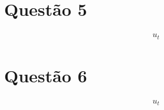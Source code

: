 \documentclass[12pt,a4paper]{article}
\begin{document}
		\begin{flushright}
		\end{flushright}

	\section{Quest\~ao 5}
		\begin{align}
			&u_t
		\end{align}

		\begin{flushright}
		\end{flushright}

	\section{Quest\~ao 6}
		\begin{align}
			&u_t
		\end{align}

		\begin{flushright}
		\end{flushright}
\end{document}
